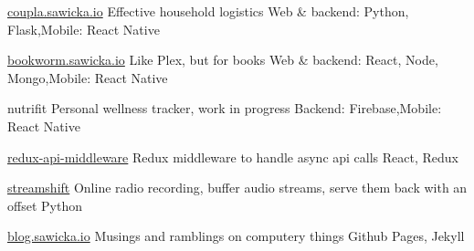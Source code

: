 
\begin{cvprojects}

	\cvproject
		{\href{http://coupla.sawicka.io}{coupla.sawicka.io}}
		{Effective household logistics}
		{Web \& backend: Python, Flask,\newline Mobile: React Native}

	\cvproject
		{\href{http://bookworm.sawicka.io}{bookworm.sawicka.io}}
		{Like Plex, but for books}
		{Web \& backend: React, Node, Mongo,\newline Mobile: React Native}

	\cvproject
		{nutrifit}
		{Personal wellness tracker, work in progress}
		{Backend: Firebase,\newline Mobile: React Native}

	\cvproject
		{\faGithub\acvHeaderIconSep \href{https://github.com/goshasawicka/redux-api-middleware}{redux-api-middleware}}
		{Redux middleware to handle async api calls}
		{React, Redux}

	\cvproject
		{\faGithub\acvHeaderIconSep \href{https://github.com/goshasawicka/streamshift}{streamshift}}
		{Online radio recording, buffer audio streams, serve them back with an offset}
		{Python}

	\cvproject
		{\faGithub\acvHeaderIconSep \href{http://blog.sawicka.io}{blog.sawicka.io}}
		{Musings and ramblings on computery things}
		{Github Pages, Jekyll}

\end{cvprojects}
